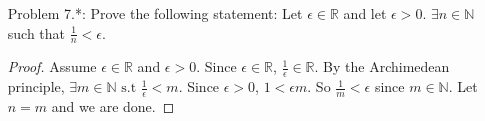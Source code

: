 \documentclass{article}
\theoremstyle{claim}
\theoremstyle{definition}
\begin{document}
\begin{enumerate}
\begin{proof}
        Thus $0$ is the infimum of the set $S = \{ x \in \mathbb{R} \mid x^{-1} \in \mathbb{N} \}$.
    \end{proof}
    \item[Problem 7.*:] Prove the following statement: Let $\epsilon \in \mathbb{R}$ and let $\epsilon > 0$. $\exists n \in \mathbb{N}$ such that $\frac{1}{n} < \epsilon$.
        \begin{proof}
            Assume $\epsilon \in \mathbb{R}$ and $\epsilon > 0$. Since $\epsilon \in \mathbb{R}$, $\frac{1}{\epsilon} \in \mathbb{R}$. By the Archimedean principle, $\exists m \in \mathbb{N} \text{ s.t } \frac{1}{\epsilon} < m$. Since $\epsilon > 0$, $1 < \epsilon m$. So $\frac{1}{m} < \epsilon$ since $m \in \mathbb{N}$. Let $n = m$ and we are done.
        \end{proof}
\end{enumerate}
\end{document}
